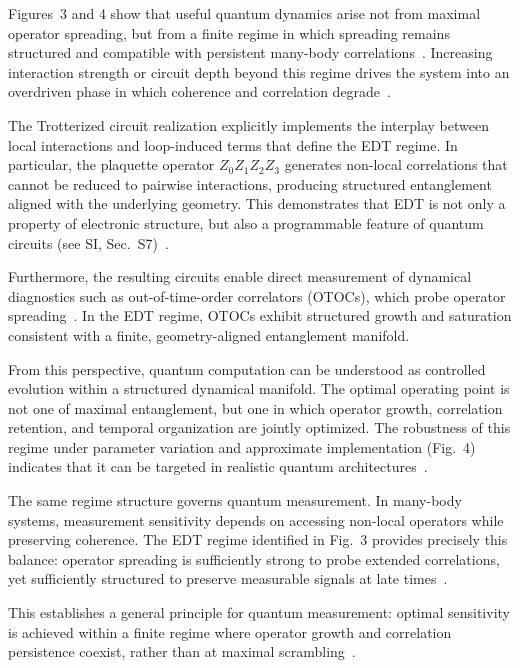 \documentclass[twocolumn,10pt]{article}
\begin{document}
Figures~3 and 4 show that useful quantum dynamics arise not from maximal operator spreading, but from a finite regime in which spreading remains structured and compatible with persistent many-body correlations~\cite{Swingle2018,Choi2016}. Increasing interaction strength or circuit depth beyond this regime drives the system into an overdriven phase in which coherence and correlation degrade~\cite{Altman2015}.

The Trotterized circuit realization explicitly implements the interplay between local interactions and loop-induced terms that define the EDT regime. In particular, the plaquette operator $Z_0 Z_1 Z_2 Z_3$ generates non-local correlations that cannot be reduced to pairwise interactions, producing structured entanglement aligned with the underlying geometry. This demonstrates that EDT is not only a property of electronic structure, but also a programmable feature of quantum circuits (see SI, Sec.~S7)~\cite{Lloyd1996,Childs2019,Trotter1959,Suzuki1990}.

Furthermore, the resulting circuits enable direct measurement of dynamical diagnostics such as out-of-time-order correlators (OTOCs), which probe operator spreading~\cite{Larkin1969,Swingle2018}. In the EDT regime, OTOCs exhibit structured growth and saturation consistent with a finite, geometry-aligned entanglement manifold.

From this perspective, quantum computation can be understood as controlled evolution within a structured dynamical manifold. The optimal operating point is not one of maximal entanglement, but one in which operator growth, correlation retention, and temporal organization are jointly optimized. The robustness of this regime under parameter variation and approximate implementation (Fig.~4) indicates that it can be targeted in realistic quantum architectures~\cite{Preskill2018,Arute2019}.

The same regime structure governs quantum measurement. In many-body systems, measurement sensitivity depends on accessing non-local operators while preserving coherence. The EDT regime identified in Fig.~3 provides precisely this balance: operator spreading is sufficiently strong to probe extended correlations, yet sufficiently structured to preserve measurable signals at late times~\cite{KimHuse2013,Choi2016}.

This establishes a general principle for quantum measurement: optimal sensitivity is achieved within a finite regime where operator growth and correlation persistence coexist, rather than at maximal scrambling~\cite{Swingle2018}.
\end{document}
